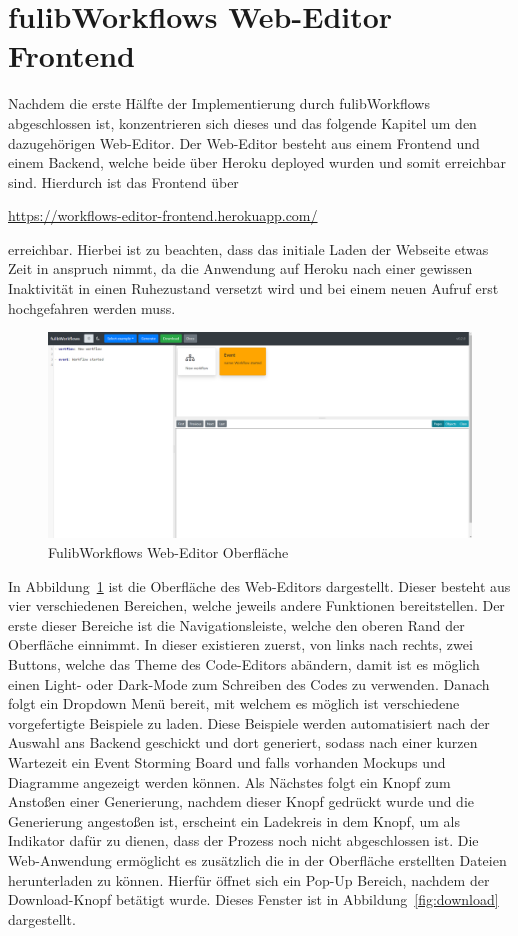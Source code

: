 \section{fulibWorkflows Web-Editor Frontend}\label{sec:editor-frontend}
Nachdem die erste Hälfte der Implementierung durch fulibWorkflows abgeschlossen ist, konzentrieren sich dieses und das folgende Kapitel um den dazugehörigen Web-Editor.
Der Web-Editor besteht aus einem Frontend und einem Backend, welche beide über Heroku deployed wurden und somit erreichbar sind.
Hierdurch ist das Frontend über

\-\hspace{3cm}\url{https://workflows-editor-frontend.herokuapp.com/}

erreichbar.
Hierbei ist zu beachten, dass das initiale Laden der Webseite etwas Zeit in anspruch nimmt, da die Anwendung auf Heroku nach einer gewissen
Inaktivität in einen Ruhezustand versetzt wird und bei einem neuen Aufruf erst hochgefahren werden muss.

\begin{figure}[h]
    \centering
    \includegraphics[width=1.0\textwidth]{images/3.2/workflows-complete}
    \caption{FulibWorkflows Web-Editor Oberfläche}
    \label{fig:frontend}
\end{figure}

In Abbildung~\ref{fig:frontend} ist die Oberfläche des Web-Editors dargestellt.
Dieser besteht aus vier verschiedenen Bereichen, welche jeweils andere Funktionen bereitstellen.
Der erste dieser Bereiche ist die Navigationsleiste, welche den oberen Rand der Oberfläche einnimmt.
In dieser existieren zuerst, von links nach rechts, zwei Buttons, welche das Theme des Code-Editors abändern, damit ist es möglich einen Light- oder Dark-Mode zum Schreiben
des Codes zu verwenden.
Danach folgt ein Dropdown Menü bereit, mit welchem es möglich ist verschiedene vorgefertigte Beispiele zu laden.
Diese Beispiele werden automatisiert nach der Auswahl ans Backend geschickt und dort generiert, sodass nach einer kurzen Wartezeit ein Event Storming Board und falls
vorhanden Mockups und Diagramme angezeigt werden können.
Als Nächstes folgt ein Knopf zum Anstoßen einer Generierung, nachdem dieser Knopf gedrückt wurde und die Generierung angestoßen ist, erscheint ein Ladekreis in dem Knopf,
um als Indikator dafür zu dienen, dass der Prozess noch nicht abgeschlossen ist.
Die Web-Anwendung ermöglicht es zusätzlich die in der Oberfläche erstellten Dateien herunterladen zu können.
Hierfür öffnet sich ein Pop-Up Bereich, nachdem der Download-Knopf betätigt wurde.
Dieses Fenster ist in Abbildung~\ref{fig:download} dargestellt.

